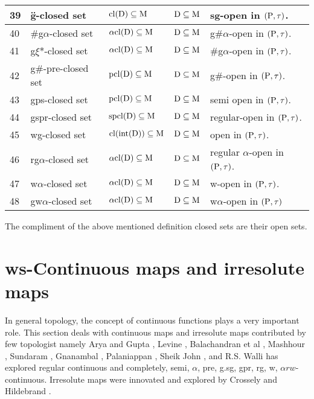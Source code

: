 {\begin{longtable}{@{}|p{.9cm}|>{\raggedright}p{5cm}|>{\centering}p{2.5cm}|>{\centering}p{1.7cm}|>{\centering}p{2.8cm}|@{}}
\hline
39 & \"g-closed set \cite{key} & $\mathrm{cl}(\mathrm{D}) \subseteq \mathrm{M}$ & $\mathrm{D} \subseteq \mathrm{M}$ & sg-open in $(\mathrm{P}, \tau)$.\tabularnewline
\hline
40 & \#g$\alpha$-closed set \cite{Maki4} & $\alpha\mathrm{cl}(\mathrm{D}) \subseteq \mathrm{M}$ & $\mathrm{D} \subseteq \mathrm{M}$ & g\#$\alpha$-open in $(\mathrm{P}, \tau)$.\tabularnewline
\hline
41 & g$\xi$*-closed set \cite{VivekPrabu} & $\alpha\mathrm{cl}(\mathrm{D}) \subseteq \mathrm{M}$ & $\mathrm{D} \subseteq \mathrm{M}$ & \#g$\alpha$-open in $(\mathrm{P}, \tau)$.\tabularnewline
\hline
42 & g\#-pre-closed set \cite{Pious} & $\mathrm{pcl}(\mathrm{D}) \subseteq \mathrm{M}$ & $\mathrm{D} \subseteq \mathrm{M}$ & g\#-open in $(\mathrm{P}, \tau)$.\tabularnewline
\hline
43 & gps-closed set \cite{Gnanambal1} & $\mathrm{pcl}(\mathrm{D}) \subseteq \mathrm{M}$ & $\mathrm{D} \subseteq \mathrm{M}$ & semi open in $(\mathrm{P}, \tau)$.\tabularnewline
\hline
44 & gspr-closed set \cite{Navalagi} & $\mathrm{spcl}(\mathrm{D}) \subseteq \mathrm{M}$ & $\mathrm{D} \subseteq \mathrm{M}$ & regular-open in $(\mathrm{P}, \tau)$.\tabularnewline
\hline
45 & wg-closed set \cite{Nagaveni3} & $\mathrm{cl}(\mbox{int}(\mathrm{D})) \subseteq \mathrm{M}$ & $\mathrm{D} \subseteq \mathrm{M}$ & open in $(\mathrm{P}, \tau)$.\tabularnewline
\hline
46 & rg$\alpha$-closed set \cite{Vadivel} & $\alpha\mathrm{cl}(\mathrm{D}) \subseteq \mathrm{M}$ & $\mathrm{D} \subseteq \mathrm{M}$ & regular $\alpha$-open in $(\mathrm{P}, \tau)$.\tabularnewline
\hline
47 & w$\alpha$-closed set \cite{Benchalli1} & $\alpha\mathrm{cl}(\mathrm{D}) \subseteq \mathrm{M}$ & $\mathrm{D} \subseteq \mathrm{M}$ & w-open in $(\mathrm{P}, \tau)$.\tabularnewline
\hline
48 & gw$\alpha$-closed set \cite{Benchalli2} & $\alpha\mathrm{cl}(\mathrm{D}) \subseteq \mathrm{M}$ & $\mathrm{D} \subseteq \mathrm{M}$ & w$\alpha$-open in $(\mathrm{P}, \tau)$\tabularnewline
\hline
\end{longtable}}

The compliment of the above mentioned definition closed sets are their open sets. 

\section{ws-Continuous maps and irresolute maps}

In general topology, the concept of continuous functions plays a very important role. This section deals with continuous maps and irresolute maps contributed by few topologist namely Arya and Gupta \cite{Arya1},  Levine \cite{Levine1}, Balachandran et al \cite{Maki11}, Mashhour \cite{Abd1}, Sundaram \cite{Maki2},  Gnanambal \cite{Gnanambal}, Palaniappan \cite{Palaniappan}, Sheik John \cite{Sheik1}, and R.S. Walli \cite{Wali4} has explored regular continuous and completely, semi,  $\alpha$, pre, g.sg, gpr, rg, w, $\alpha rw$-continuous. Irresolute maps were innovated and explored by Crossely and Hildebrand \cite{Crossley}.

